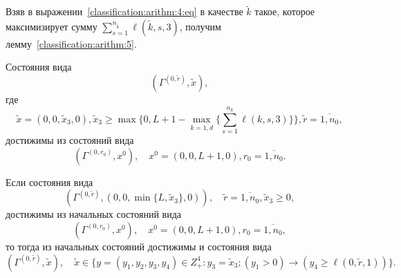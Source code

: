 Взяв в выражении~\eqref{classification:arithm:4:eq} в качестве $\tilde{k}$ такое, которое максимизирует сумму $\sum_{s=1}^{n_{\tilde{k}}} \ell(\tilde{k},  s,  3)$, получим лемму~\ref{classification:arithm:5}.
\begin{lemma}
Состояния вида 
$$
(\Gamma^{(0,  \tilde{r})},  \tilde{x}), 
$$
где 
$$
\tilde{x}=(0,  0,  \tilde{x}_3,  0),  \tilde{x}_3\geqslant \max{\{0,  L+1-\max_{k=\overline{1,  d}}{\{ \sum_{s=1}^{n_k}\ell(k,  s,  3)\}}\}}, 
\tilde{r} = \overline{1,  n_0}, 
$$
достижимы из состояний вида  
\begin{equation*}
(\Gamma^{(0,  r_0)},  x^0),  \quad x^0=(0,  0,  L+1,  0),   r_0=\overline{1,  n_0}.
\end{equation*}
\label{classification:arithm:5}
\end{lemma}
\begin{lemma}
Если состояния вида
$$
(\Gamma^{(0,  \tilde{r})},  (0,  0,  \min\{L,  \tilde{x}_3\},  0)),  \quad \tilde{r}=\overline{1, n_0},  \tilde{x}_3 \geqslant 0, 
$$
достижимы из начальных состояний вида
$$
(\Gamma^{(0,  r_0)},  x^0),  \quad x^0=(0,  0,  L+1,  0),  r_0=\overline{1, n_0}, 
$$
то тогда из начальных состояний достижимы и состояния вида
$$
(\Gamma^{(0,  \tilde{r})},  \tilde{x}),  \quad
 \tilde{x} \in \{y = (y_1,  y_2,  y_3,  y_4) \in Z_+^4\colon y_3=\tilde{x}_3; (y_1 > 0)\rightarrow (y_4\geqslant \ell(0,  \tilde{r},  1))\}.
 $$
 
\label{classification:arithm:6}
\end{lemma}

